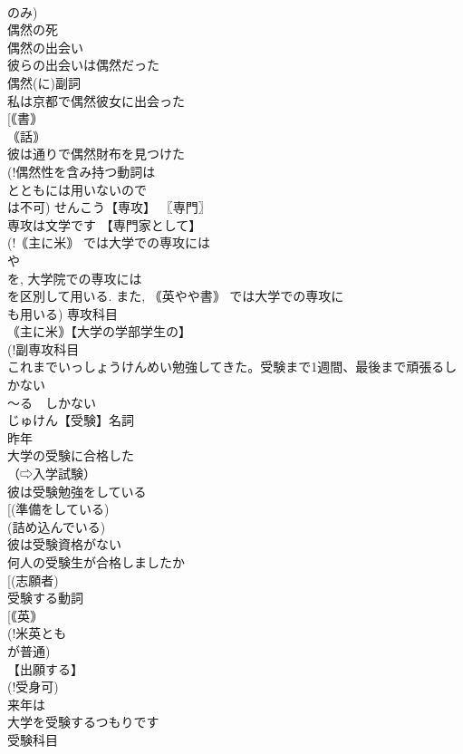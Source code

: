 \documentclass[8pt]{extreport}
\begin{document}
\begin{CJK}{UTF8}{min}
\\	のみ) 
\\	偶然の死 
\\	偶然の出会い 
\\	彼らの出会いは偶然だった 
\\	偶然(に)副詞 
\\	私は京都で偶然彼女に出会った 
\\	[｟書｠ 
\\	｟話｠
\\	彼は通りで偶然財布を見つけた 
\\	(!偶然性を含み持つ動詞は 
\\	とともには用いないので 
\\	は不可) せんこう【専攻】 〖専門〗
\\	専攻は文学です 【専門家として】
\\	(!｟主に米｠ では大学での専攻には 
\\	や 
\\	を, 大学院での専攻には 
\\	を区別して用いる. また, ｟英やや書｠ では大学での専攻に 
\\	も用いる) 専攻科目 
\\	｟主に米｠【大学の学部学生の】
\\	(!副専攻科目 
\\	これまでいっしょうけんめい勉強してきた。受験まで1週間、最後まで頑張るしかない
\\	〜る　しかない　
\\	じゅけん【受験】名詞 
\\	昨年
\\	大学の受験に合格した 
\\	（⇨入学試験） 
\\	彼は受験勉強をしている 
\\	[(準備をしている) 
\\	(詰め込んでいる) 
\\	彼は受験資格がない 
\\	何人の受験生が合格しましたか 
\\	[(志願者) 
\\	受験する動詞 
\\	[｟英｠ 
\\	(!米英とも 
\\	が普通) 
\\	【出願する】
\\	(!受身可) 
\\	来年は
\\	大学を受験するつもりです 
\\	受験科目 

\end{CJK}
\end{document}
